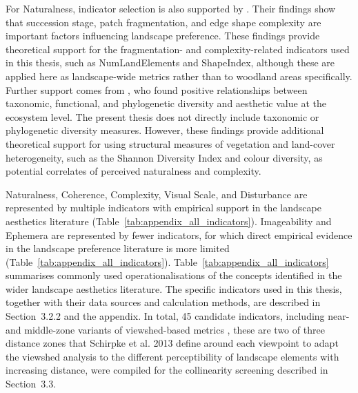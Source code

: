 \documentclass[11pt]{article}
\renewcommand{\_}{\textunderscore\allowbreak{}}
\begin{document}
For Naturalness, indicator selection is also supported by \citet{ode_indicators_2009}. Their findings show that succession stage, patch fragmentation, and edge shape complexity are important factors influencing landscape preference. These findings provide theoretical support for the fragmentation- and complexity-related indicators used in this thesis, such as NumLandElements and ShapeIndex, although these are applied here as landscape-wide metrics rather than to woodland areas specifically. Further support comes from \citet{tribot_integrating_2018}, who found positive relationships between taxonomic, functional, and phylogenetic diversity and aesthetic value at the ecosystem level. The present thesis does not directly include taxonomic or phylogenetic diversity measures. However, these findings provide additional theoretical support for using structural measures of vegetation and land-cover heterogeneity, such as the Shannon Diversity Index and colour diversity, as potential correlates of perceived naturalness and complexity.

Naturalness, Coherence, Complexity, Visual Scale, and Disturbance are represented by multiple indicators with empirical support in the landscape aesthetics literature (Table~\ref{tab:appendix_all_indicators}). Imageability and Ephemera are represented by fewer indicators, for which direct empirical evidence in the landscape preference literature is more limited (Table~\ref{tab:appendix_all_indicators}). Table~\ref{tab:appendix_all_indicators} summarises commonly used operationalisations of the concepts identified in the wider landscape aesthetics literature. The specific indicators used in this thesis, together with their data sources and calculation methods, are described in Section~3.2.2 and the appendix. In total, 45 candidate indicators, including near- and middle-zone variants of viewshed-based metrics , these are two of three distance zones that Schirpke et al. 2013 define around each viewpoint to adapt the viewshed analysis to the different perceptibility of landscape elements with increasing distance, were compiled for the collinearity screening described in Section~3.3.
\end{document}
